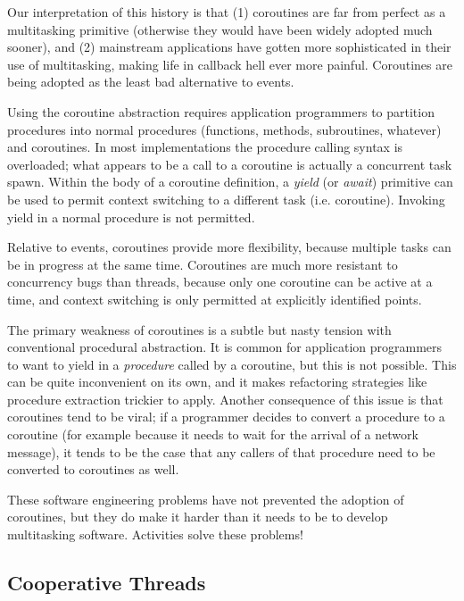 \documentclass[10pt,preprint]{sigplanconf}
\begin{document}
Our interpretation of this history is that (1) coroutines are far from perfect as a multitasking primitive (otherwise they would have been widely adopted much sooner), and (2) mainstream applications have gotten more sophisticated in their use of multitasking, making life in callback hell ever more painful.
Coroutines are being adopted as the least bad alternative to events.

Using the coroutine abstraction requires application programmers to partition procedures into normal procedures (functions, methods, subroutines, whatever) and coroutines.
In most implementations the procedure calling syntax is overloaded; what appears to be a call to a coroutine is actually a concurrent task spawn.
Within the body of a coroutine definition, a \emph{yield} (or \emph{await}) primitive can be used to permit context switching to a different task (i.e. coroutine).
Invoking yield in a normal procedure is not permitted.

Relative to events, coroutines provide more flexibility, because multiple tasks can be in progress at the same time.
Coroutines are much more resistant to concurrency bugs than threads, because only one coroutine can be active at a time, and context switching is only permitted at explicitly identified points.

The primary weakness of coroutines is a subtle but nasty tension with conventional procedural abstraction.
It is common for application programmers to want to yield in a \emph{procedure} called by a coroutine, but this is not possible.
This can be quite inconvenient on its own, and it makes refactoring strategies like procedure extraction trickier to apply.
Another consequence of this issue is that coroutines tend to be viral; if a programmer decides to convert a procedure to a coroutine (for example because it needs to wait for the arrival of a network message), it tends to be the case that any callers of that procedure need to be converted to coroutines as well.



These software engineering problems have not prevented the adoption of coroutines, but they do make it harder than it needs to be to develop multitasking software.
Activities solve these problems!

\subsection{Cooperative Threads}
\end{document}

